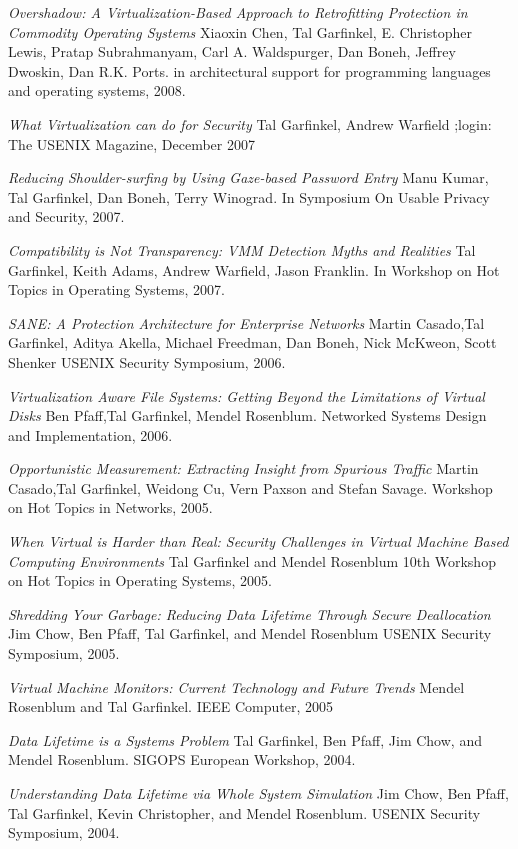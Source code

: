\begin{resume}
{\em Overshadow: A Virtualization-Based Approach to Retrofitting
Protection in Commodity Operating Systems} Xiaoxin Chen, Tal
Garfinkel, E. Christopher Lewis, Pratap Subrahmanyam, Carl A.
Waldspurger, Dan Boneh, Jeffrey Dwoskin, Dan R.K. Ports.
in architectural support for programming languages and operating
systems, 2008.


{\em What Virtualization can do for Security} Tal Garfinkel, Andrew
Warfield ;login: The USENIX Magazine, December 2007


{\em Reducing Shoulder-surfing by Using Gaze-based Password Entry}
Manu Kumar, Tal Garfinkel, Dan Boneh, Terry Winograd. In Symposium On Usable
Privacy and Security, 2007.

\pagebreak

{\em Compatibility is Not Transparency: VMM Detection Myths and
Realities} Tal Garfinkel, Keith Adams, Andrew Warfield, Jason
Franklin.  In Workshop on Hot Topics in Operating Systems, 2007.

{\em SANE: A Protection Architecture for Enterprise Networks} Martin
Casado,Tal Garfinkel, Aditya Akella, Michael Freedman, Dan Boneh,
Nick McKweon, Scott Shenker USENIX Security Symposium, 2006.


{\em  Virtualization Aware File Systems: Getting Beyond the Limitations
of Virtual Disks} Ben Pfaff,Tal Garfinkel, Mendel Rosenblum.  Networked Systems
Design and Implementation, 2006.

{\em Opportunistic Measurement: Extracting Insight from Spurious
Traffic} Martin Casado,Tal Garfinkel, Weidong Cu, Vern Paxson and Stefan
Savage. Workshop on Hot Topics in Networks, 2005.

{\em When Virtual is Harder than Real: Security Challenges in Virtual Machine
Based Computing Environments} Tal Garfinkel and Mendel Rosenblum 10th Workshop
on Hot Topics in Operating Systems, 2005.

{\em Shredding Your Garbage: Reducing Data Lifetime Through Secure
Deallocation} Jim Chow, Ben Pfaff, Tal Garfinkel, and Mendel Rosenblum
USENIX Security Symposium, 2005.

{\em  Virtual Machine Monitors: Current Technology and Future
Trends} Mendel Rosenblum and Tal Garfinkel. IEEE Computer, 2005

{\em Data Lifetime is a Systems Problem} Tal Garfinkel, Ben Pfaff, Jim
Chow, and Mendel Rosenblum.  SIGOPS European Workshop, 2004.

{\em Understanding Data Lifetime via Whole System Simulation}
Jim Chow, Ben Pfaff, Tal Garfinkel, Kevin Christopher, and Mendel
Rosenblum. USENIX Security Symposium, 2004.



\end{resume}
